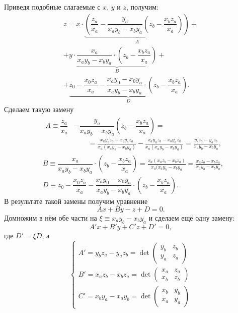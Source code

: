 Приведя подобные слагаемые с $x$, $y$ и $z$, получим:
\begin{multline*}
z = x \cdot \underbrace{\left( \dfrac{z_a}{x_a} - \dfrac{y_a}{x_a y_b - x_b y_a} \left( z_b - \dfrac{x_b z_a}{x_a} \right) \right)}_A +\\
+ y \cdot \underbrace{\dfrac{x_a}{x_a y_b - x_b y_a} \cdot \left( z_b - \dfrac{x_b z_a}{x_a} \right)}_B +\\
+ \underbrace{z_0 - \dfrac{x_0 z_a}{x_a} - \dfrac{x_a y_0 - x_0 y_a}{x_a y_b - x_b y_a} \cdot \left( z_b - \dfrac{x_b z_a}{x_a} \right)}_D.
\end{multline*}
Сделаем такую замену
\begin{align*}
&
\begin{aligned}
	A \equiv  \dfrac{z_a}{x_a} &- \dfrac{y_a}{x_a y_b - x_b y_a} \left( z_b - \dfrac{x_b z_a}{x_a} \right) = \\
	&\quad\quad= \frac{x_a y_b z_a - x_b y_a z_a}{x_a (x_a y_b - x_b y_a)} - \frac{x_a y_a z_b - x_b y_a z_a}{x_a (x_a y_b - x_b y_a)} = \frac{y_b z_a - y_a z_b}{x_a y_b - x_b y_a},
\end{aligned}\\
&
B \equiv \dfrac{x_a}{x_a y_b - x_b y_a} \cdot \left( z_b - \dfrac{x_b z_a}{x_a} \right) = \frac{x_a (x_a z_b - x_b z_a)}{x_a (x_a y_b - x_b y_a} = \frac{x_a z_b - x_b z_a}{x_a y_b - x_b y_a},\\
&
D \equiv z_0 - \dfrac{x_0 z_a}{x_a} - \dfrac{x_a y_0 - x_0 y_a}{x_a y_b - x_b y_a} \cdot \left( z_b - \dfrac{x_b z_a}{x_a} \right).
\end{align*}
В результате такой замены получим уравнение
\begin{equation}
Ax + By - z + D = 0.
\end{equation}
Домножим в нём обе части на $\xi \equiv x_a y_b - x_b y_a$ и сделаем ещё одну замену:
\begin{equation*}
A'x + B'y + C'z + D' = 0,
\end{equation*}
где $D' = \xi D$, а
\begin{equation*}
\begin{cases}
	A' = y_b z_a - y_a z_b = \det
	\begin{pmatrix}
		y_b & z_b\\
		y_a & z_a
	\end{pmatrix}\\[1pc]
	B' = x_a z_b - x_b z_a = \det
	\begin{pmatrix}
		x_a & z_a\\
		x_b & z_b
	\end{pmatrix}\\[1pc]
	C' = x_b y_a - x_a y_b = \det
	\begin{pmatrix}
		x_b & y_b\\
		x_a & y_a
	\end{pmatrix}
\end{cases}
\end{equation*}
